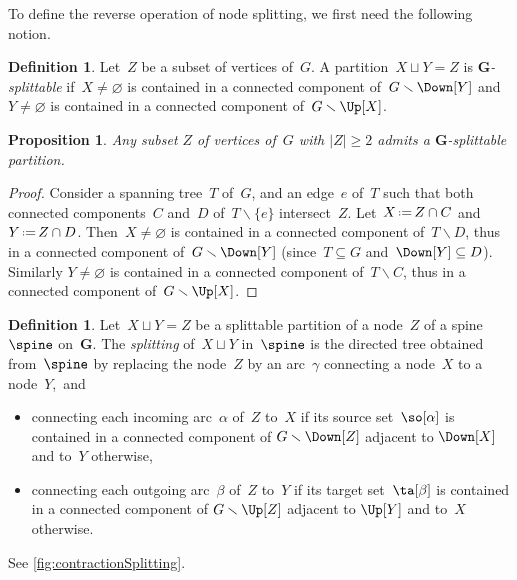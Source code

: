 \documentclass{amsart}
\newtheorem{proposition}[theorem]{Proposition}
\theoremstyle{definition}
\newtheorem{definition}[theorem]{Definition}
\renewcommand{\b}[1]{{\boldsymbol{#1}}} %
\newcommand{\ssm}{\smallsetminus} %
\newcommand{\eqdef}{\mbox{\,\raisebox{0.2ex}{\scriptsize\ensuremath{\mathrm:}}\ensuremath{=}\,}} %
\newcommand{\darkblue}{\color{darkblue}} %
\newcommand{\defn}[1]{\textsl{\darkblue #1}} %
\begin{document}
To define the reverse operation of node splitting, we first need the following notion.

\begin{definition}
  \label{def:splittable}
  Let~$Z$ be a subset of vertices of~$G$.
  A partition~$X \sqcup Y = Z$ is \defn{$\b{G}$-splittable} if~$X \ne \varnothing$ is contained in a connected component of~$G \ssm \Down[Y]$ and $Y \ne \varnothing$ is contained in a connected component of~$G \ssm \Up[X]$.
\end{definition}

\begin{proposition}
  \label{prop:splittablePartitions}
  Any subset $Z$ of vertices of~$G$ with $|Z| \ge 2$ admits a $\b{G}$-splittable partition.
\end{proposition}

\begin{proof} 
  Consider a spanning tree~$T$ of~$G$, and an edge~$e$ of~$T$ such that both connected components~$C$ and~$D$ of~$T \ssm \{e\}$ intersect~$Z$.
  Let~$X \eqdef Z \cap C$ and~$Y \eqdef Z \cap D$.
  Then~$X \ne \varnothing$ is contained in a connected component of~$T \ssm D$, thus in a connected component of~$G \ssm \Down[Y]$ (since~$T \subseteq G$ and~$\Down[Y] \subseteq D$).
  Similarly $Y \ne \varnothing$ is contained in a connected component of~$T \ssm C$, thus in a connected component of~$G \ssm \Up[X]$.
\end{proof}

\begin{definition}
  \label{def:nodeSplitting} 
  Let~$X \sqcup Y = Z$ be a splittable partition of a node~$Z$ of a spine~$\spine$ on~$\b{G}$.
  The \defn{splitting} of~$X \sqcup Y$ in~$\spine$ is the directed tree obtained from~$\spine$ by replacing the node~$Z$ by an arc~$\gamma$ connecting a node~$X$ to a node~$Y$,~and
  \begin{itemize}
    \item connecting each incoming arc~$\alpha$ of~$Z$ to~$X$ if its source set~$\so[\alpha]$ is contained in a connected component of $G \ssm \Down[Z]$ adjacent to $\Down[X]$ and to~$Y$ otherwise, 
    \item connecting each outgoing arc~$\beta$ of~$Z$ to~$Y$ if its target set~$\ta[\beta]$ is contained in a connected component of $G \ssm \Up[Z]$ adjacent to $\Up[Y]$ and to~$X$ otherwise.
  \end{itemize}
  See \cref{fig:contractionSplitting}.
\end{definition}
\end{document}
